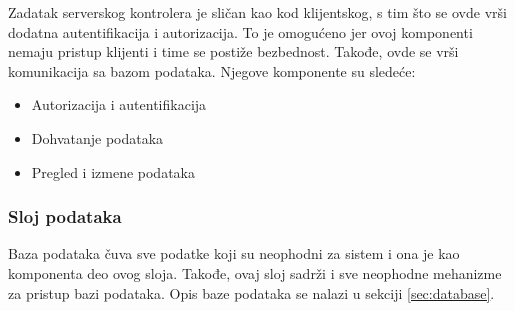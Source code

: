 Zadatak serverskog kontrolera je sličan kao kod klijentskog, s tim što se ovde vrši dodatna autentifikacija 
i autorizacija. To je omogućeno jer ovoj komponenti nemaju pristup klijenti i time se postiže bezbednost.
Takođe, ovde se vrši komunikacija sa bazom podataka.
Njegove komponente su sledeće:

\begin{itemize}
    \item Autorizacija i autentifikacija
    \item Dohvatanje podataka
    \item Pregled i izmene podataka 
\end{itemize}

\subsubsection {Sloj podataka}

Baza podataka čuva sve podatke koji su neophodni za sistem i ona je kao komponenta deo ovog sloja.
Takođe, ovaj sloj sadrži i sve neophodne mehanizme za pristup bazi podataka.
Opis baze podataka se nalazi u sekciji \ref{sec:database}.